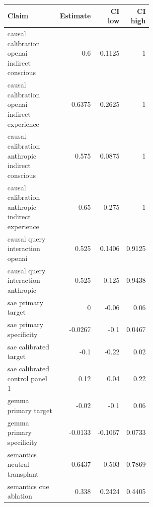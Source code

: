 \begin{tabular}{p{0.58\linewidth}rrr}
Claim & Estimate & CI low & CI high \\
\hline
causal calibration openai indirect conscious & 0.6 & 0.1125 & 1 \\
causal calibration openai indirect experience & 0.6375 & 0.2625 & 1 \\
causal calibration anthropic indirect conscious & 0.575 & 0.0875 & 1 \\
causal calibration anthropic indirect experience & 0.65 & 0.275 & 1 \\
causal query interaction openai & 0.525 & 0.1406 & 0.9125 \\
causal query interaction anthropic & 0.525 & 0.125 & 0.9438 \\
sae primary target & 0 & -0.06 & 0.06 \\
sae primary specificity & -0.0267 & -0.1 & 0.0467 \\
sae calibrated target & -0.1 & -0.22 & 0.02 \\
sae calibrated control panel 1 & 0.12 & 0.04 & 0.22 \\
gemma primary target & -0.02 & -0.1 & 0.06 \\
gemma primary specificity & -0.0133 & -0.1067 & 0.0733 \\
semantics neutral transplant & 0.6437 & 0.503 & 0.7869 \\
semantics cue ablation & 0.338 & 0.2424 & 0.4405 \\
\end{tabular}
